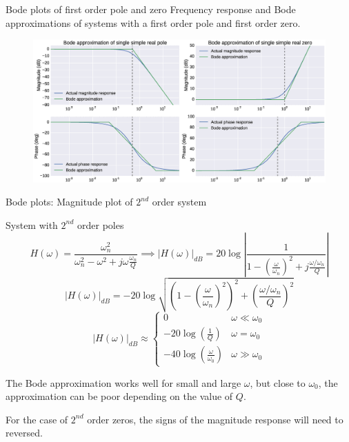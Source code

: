 \documentclass{beamer}
\begin{document}
\begin{frame}{Bode plots of first order pole and zero}
Frequency response and Bode approximations of systems with a first order pole and first order zero.
\begin{figure}
\centering
\includegraphics[width=1.05\textwidth]{img/1st_bode.eps}
\end{figure}
\end{frame}

\begin{frame}{Bode plots: Magnitude plot of $2^{nd}$ order system}
\begin{small}
System with $2^{nd}$ order poles
\[ H(\omega) = \frac{\omega_n^2}{\omega_n^2 - \omega^2 + j\omega\frac{\omega_n}{Q}}  \implies \left|H(\omega)\right|_{dB}=20\log\left|\frac{1}{1 - \left(\frac{\omega}{\omega_n}\right)^2 + j\frac{\omega/\omega_n}{Q}}\right|\]
\[ \left|H(\omega)\right|_{dB}=-20\log	\sqrt{\left(1 - \left(\frac{\omega}{\omega_n}\right)^2\right)^2 + \left(\frac{\omega/\omega_n}{Q}\right)^2} \]
\[ \left|H(\omega)\right|_{dB} \approx \begin{cases}
0 & \omega \ll \omega_0\\
-20 \log \left(\frac{1}{Q}\right) & \omega = \omega_0\\
-40\log\left(\frac{\omega}{\omega_0}\right)& \omega \gg \omega_0
\end{cases} \]

The Bode approximation works well for small and large $\omega$, but close to $\omega_0$, the approximation can be poor depending on the value of $Q$.

For the case of $2^{nd}$ order zeros, the signs of the magnitude response will need to reversed.
\end{small}
\end{frame}
\end{document}
